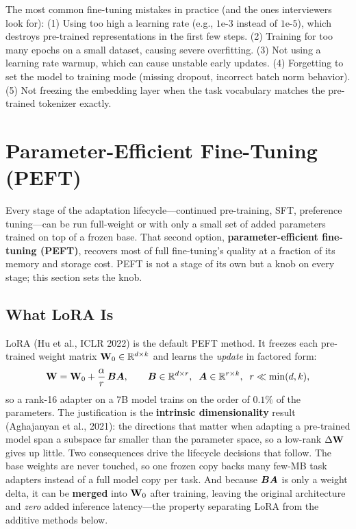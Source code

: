 \begin{warningbox}
The most common fine-tuning mistakes in practice (and the ones interviewers
look for): (1) Using too high a learning rate (e.g., $1\text{e-}3$ instead of
$1\text{e-}5$), which destroys pre-trained representations in the first few
steps. (2) Training for too many epochs on a small dataset, causing severe
overfitting. (3) Not using a learning rate warmup, which can cause unstable
early updates. (4) Forgetting to set the model to training mode (missing
dropout, incorrect batch norm behavior). (5) Not freezing the embedding layer
when the task vocabulary matches the pre-trained tokenizer exactly.
\end{warningbox}


\section{Parameter-Efficient Fine-Tuning (PEFT)}
\label{sec:peft}

Every stage of the adaptation lifecycle---continued pre-training, SFT,
preference tuning---can be run full-weight or with only a small set of added
parameters trained on top of a frozen base.  That second option,
\textbf{parameter-efficient fine-tuning (PEFT)}, recovers most of full
fine-tuning's quality at a fraction of its memory and storage cost.  PEFT is
not a stage of its own but a knob on every stage; this section sets the knob.

\subsection{What LoRA Is}
\label{sec:lora}

LoRA (Hu et al., ICLR 2022) is the default PEFT method.  It freezes each
pre-trained weight matrix $\mathbf{W}_0 \in \mathbb{R}^{d \times k}$ and learns the
\emph{update} in factored form:
\[
    \mathbf{W} = \mathbf{W}_0 + \frac{\alpha}{r}\,\bm{B}\bm{A},
    \qquad
    \bm{B} \in \mathbb{R}^{d \times r},\;\; \bm{A} \in \mathbb{R}^{r \times k},\;\; r \ll \min(d, k),
\]
so a rank-16 adapter on a 7B model trains on the order of $0.1\%$ of the
parameters.  The justification is the \textbf{intrinsic dimensionality} result
(Aghajanyan et al., 2021): the directions that matter when adapting a
pre-trained model span a subspace far smaller than the parameter space, so a
low-rank $\Delta\mathbf{W}$ gives up little.  Two consequences drive the lifecycle
decisions that follow.  The base weights are never touched, so one frozen copy
backs many few-MB task adapters instead of a full model copy per task.  And
because $\bm{B}\bm{A}$ is only a weight delta, it can be \textbf{merged} into
$\mathbf{W}_0$ after training, leaving the original architecture and \emph{zero}
added inference latency---the property separating LoRA from the additive
methods below.

